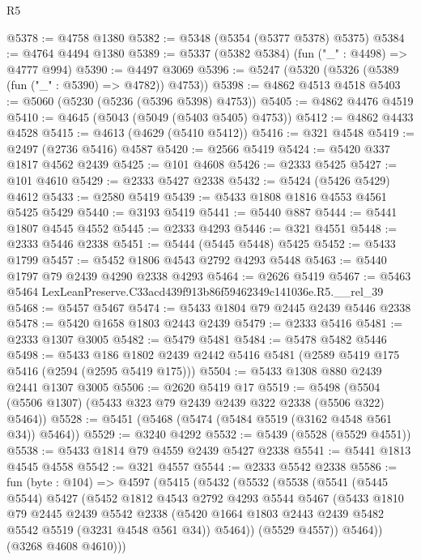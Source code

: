 \begin{lexlean}{R5}
\begin{coremodule}
@5378 := @4758 @1380
@5382 := @5348 (@5354 (@5377 @5378) @5375)
@5384 := @4764 @4494 @1380
@5389 := @5337 (@5382 @5384) (fun ("_" : @4498) => @4777 @994)
@5390 := @4497 @3069
@5396 := @5247 (@5320 (@5326 (@5389 (fun ("_" : @5390) => @4782)) @4753))
@5398 := @4862 @4513 @4518
@5403 := @5060 (@5230 (@5236 (@5396 @5398) @4753))
@5405 := @4862 @4476 @4519
@5410 := @4645 (@5043 (@5049 (@5403 @5405) @4753))
@5412 := @4862 @4433 @4528
@5415 := @4613 (@4629 (@5410 @5412))
@5416 := @321 @4548
@5419 := @2497 (@2736 @5416) @4587
@5420 := @2566 @5419
@5424 := @5420 @337 @1817 @4562 @2439
@5425 := @101 @4608
@5426 := @2333 @5425
@5427 := @101 @4610
@5429 := @2333 @5427 @2338
@5432 := @5424 (@5426 @5429) @4612
@5433 := @2580 @5419
@5439 := @5433 @1808 @1816 @4553 @4561 @5425 @5429
@5440 := @3193 @5419
@5441 := @5440 @887
@5444 := @5441 @1807 @4545 @4552
@5445 := @2333 @4293
@5446 := @321 @4551
@5448 := @2333 @5446 @2338
@5451 := @5444 (@5445 @5448) @5425
@5452 := @5433 @1799
@5457 := @5452 @1806 @4543 @2792 @4293 @5448
@5463 := @5440 @1797 @79 @2439 @4290 @2338 @4293
@5464 := @2626 @5419
@5467 := @5463 @5464 LexLeanPreserve.C33acd439f913b86f59462349c141036e.R5.__rel_39
@5468 := @5457 @5467
@5474 := @5433 @1804 @79 @2445 @2439 @5446 @2338
@5478 := @5420 @1658 @1803 @2443 @2439
@5479 := @2333 @5416
@5481 := @2333 @1307 @3005
@5482 := @5479 @5481
@5484 := @5478 @5482 @5446
@5498 := @5433
    @186
    @1802
    @2439
    @2442
    @5416
    @5481
    (@2589 @5419 @175 @5416 (@2594 (@2595 @5419 @175)))
@5504 := @5433 @1308 @880 @2439 @2441 @1307 @3005
@5506 := @2620 @5419 @17
@5519 := @5498 (@5504 (@5506 @1307) (@5433 @323 @79 @2439 @2439 @322 @2338 (@5506 @322) @5464))
@5528 := @5451 (@5468 (@5474 (@5484 @5519 (@3162 @4548 @561 @34)) @5464))
@5529 := @3240 @4292
@5532 := @5439 (@5528 (@5529 @4551))
@5538 := @5433 @1814 @79 @4559 @2439 @5427 @2338
@5541 := @5441 @1813 @4545 @4558
@5542 := @321 @4557
@5544 := @2333 @5542 @2338
@5586 := fun (byte : @104) =>
  @4597
    (@5415
      (@5432
        (@5532
          (@5538
            (@5541
              (@5445 @5544)
              @5427
              (@5452
                @1812
                @4543
                @2792
                @4293
                @5544
                @5467
                (@5433
                  @1810
                  @79
                  @2445
                  @2439
                  @5542
                  @2338
                  (@5420 @1664 @1803 @2443 @2439 @5482 @5542 @5519 (@3231 @4548 @561 @34))
                  @5464))
              (@5529 @4557))
            @5464))
        (@3268 @4608 @4610)))

\end{coremodule}
\end{lexlean}
